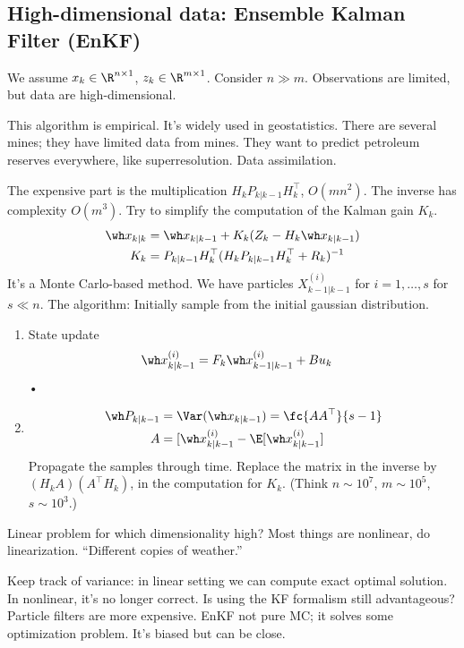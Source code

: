 \subsection{High-dimensional data: Ensemble Kalman Filter (EnKF)}

We assume $x_k\in \R^{n\times 1}$, $z_k \in \R^{m\times 1}$. Consider $n\gg m$. Observations are limited, but data are high-dimensional.

This algorithm is empirical. It's widely used in geostatistics. There are several mines; they have limited data from mines. They want to predict petroleum reserves everywhere, like superresolution. Data assimilation.

The expensive part is the multiplication $H_kP_{k|k-1}H_k^\top$, $O(mn^2)$. The inverse has complexity $O(m^3)$. Try to simplify the computation of the Kalman gain $K_k$.
\begin{align}
\wh x_{k|k} &=\wh x_{k|k-1} + K_k(Z_k-H_k\wh x_{k|k-1}) \\
K_k &=P_{k|k-1}
H_k^\top  (H_k P_{k|k-1} H_k^\top + R_k)^{-1}
\end{align}
It's a Monte Carlo-based method. We have particles $X_{k-1|k-1}^{(i)}$ for $i=1,\ldots, s$ for $s\ll n$. The algorithm: Initially sample from the initial gaussian distribution.
\begin{enumerate}
\item
State update
\begin{align}
\wh x_{k|k-1}^{(i)}
&= F_k \wh x_{k-1|k-1}^{(i)} + Bu_k
\end{align}•
\item
\begin{align}
\wh P_{k|k-1} &= \Var(\wh x_{k|k-1})
= \fc{AA^\top}{s-1}\\
A&=[\wh x_{k|k-1}^{(i)} - \E[\wh x_{k|k-1}^{(i)}]
\end{align}
Propagate the samples through time. Replace the matrix in the inverse by $(H_kA) (A^\top H_k)$, in the computation for $K_k$. 
(Think $n\sim 10^7$, $m\sim 10^5$, $s\sim 10^3$.)
\end{enumerate}

Linear problem for which dimensionality high? Most things are nonlinear, do linearization. ``Different copies of weather.''

Keep track of variance: in linear setting we can compute exact optimal solution. In nonlinear, it's no longer correct. Is using the KF formalism still advantageous? Particle filters are more expensive. EnKF not pure MC; it solves some optimization problem. It's biased but can be close.

